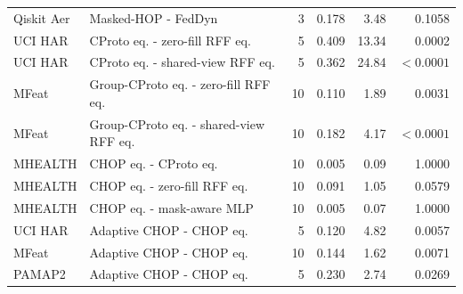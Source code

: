 \begin{table}[t]
{\begin{tabular}{llrrrr}
Qiskit Aer & Masked-HOP - FedDyn & 3 & 0.178 & 3.48 & 0.1058 \\
UCI HAR & CProto eq. - zero-fill RFF eq. & 5 & 0.409 & 13.34 & 0.0002 \\
UCI HAR & CProto eq. - shared-view RFF eq. & 5 & 0.362 & 24.84 & \(<0.0001\) \\
MFeat & Group-CProto eq. - zero-fill RFF eq. & 10 & 0.110 & 1.89 & 0.0031 \\
MFeat & Group-CProto eq. - shared-view RFF eq. & 10 & 0.182 & 4.17 & \(<0.0001\) \\
MHEALTH & CHOP eq. - CProto eq. & 10 & 0.005 & 0.09 & 1.0000 \\
MHEALTH & CHOP eq. - zero-fill RFF eq. & 10 & 0.091 & 1.05 & 0.0579 \\
MHEALTH & CHOP eq. - mask-aware MLP & 10 & 0.005 & 0.07 & 1.0000 \\
UCI HAR & Adaptive CHOP - CHOP eq. & 5 & 0.120 & 4.82 & 0.0057 \\
MFeat & Adaptive CHOP - CHOP eq. & 10 & 0.144 & 1.62 & 0.0071 \\
PAMAP2 & Adaptive CHOP - CHOP eq. & 5 & 0.230 & 2.74 & 0.0269 \\
\bottomrule
\end{tabular}%
}
\end{table}
